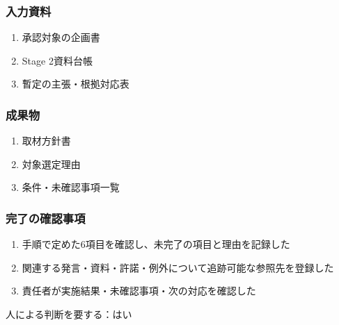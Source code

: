 \documentclass[a4paper,11pt]{article}
\begin{document}
\subsubsection*{入力資料}
\begin{enumerate}[leftmargin=2em,itemsep=0.35em]
\item 承認対象の企画書
\item Stage 2資料台帳
\item 暫定の主張・根拠対応表
\end{enumerate}
\subsubsection*{成果物}
\begin{enumerate}[leftmargin=2em,itemsep=0.35em]
\item 取材方針書
\item 対象選定理由
\item 条件・未確認事項一覧
\end{enumerate}
\subsubsection*{完了の確認事項}
\begin{enumerate}[leftmargin=2em,itemsep=0.35em]
\item 手順で定めた6項目を確認し、未完了の項目と理由を記録した
\item 関連する発言・資料・許諾・例外について追跡可能な参照先を登録した
\item 責任者が実施結果・未確認事項・次の対応を確認した
\end{enumerate}
\par 人による判断を要する：はい\par\medskip
\end{document}
